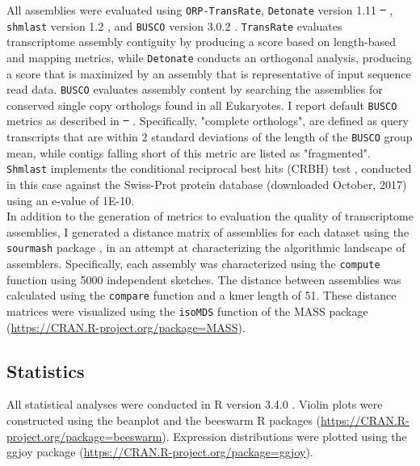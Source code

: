 \documentclass[10pt,letterpaper]{article}
\providecommand{\DIFaddtex}[1]{{\protect\color{blue}\uwave{#1}}} %
\providecommand{\DIFdeltex}[1]{{\protect\color{red}\sout{#1}}}                      %
\providecommand{\DIFaddbegin}{} %
\providecommand{\DIFaddend}{} %
\providecommand{\DIFdelbegin}{} %
\providecommand{\DIFdelend}{} %
\providecommand{\DIFadd}[1]{\texorpdfstring{\DIFaddtex{#1}}{#1}} %
\providecommand{\DIFdel}[1]{\texorpdfstring{\DIFdeltex{#1}}{}} %
\newcommand{\DIFscaledelfig}{0.5}
\newlength{\DIFdelgraphicswidth} %
\newlength{\DIFdelgraphicsheight} %
\newcommand{\DIFaddincludegraphics}[2][]{{\color{blue}\fbox{\DIFOincludegraphics[#1]{#2}}}} %
\newcommand{\DIFdelincludegraphics}[2][]{%
\sbox{\DIFdelgraphicsbox}{\DIFOincludegraphics[#1]{#2}}%
\settoboxwidth{\DIFdelgraphicswidth}{\DIFdelgraphicsbox} %
\settoboxtotalheight{\DIFdelgraphicsheight}{\DIFdelgraphicsbox} %
\scalebox{\DIFscaledelfig}{%
\parbox[b]{\DIFdelgraphicswidth}{\usebox{\DIFdelgraphicsbox}\\[-\baselineskip] \rule{\DIFdelgraphicswidth}{0em}}\llap{\resizebox{\DIFdelgraphicswidth}{\DIFdelgraphicsheight}{%
\setlength{\unitlength}{\DIFdelgraphicswidth}%
\begin{picture}(1,1)%
\thicklines\linethickness{2pt} %
{\color[rgb]{1,0,0}\put(0,0){\framebox(1,1){}}}%
{\color[rgb]{1,0,0}\put(0,0){\line( 1,1){1}}}%
{\color[rgb]{1,0,0}\put(0,1){\line(1,-1){1}}}%
\end{picture}%
}\hspace*{3pt}}} %
} %
\DeclareRobustCommand{\DIFaddbegin}{\DIFOaddbegin \let\includegraphics\DIFaddincludegraphics} %
\DeclareRobustCommand{\DIFaddend}{\DIFOaddend \let\includegraphics\DIFOincludegraphics} %
\DeclareRobustCommand{\DIFdelbegin}{\DIFOdelbegin \let\includegraphics\DIFdelincludegraphics} %
\DeclareRobustCommand{\DIFdelend}{\DIFOaddend \let\includegraphics\DIFOincludegraphics} %
\begin{document}
All assemblies were evaluated using \texttt{ORP-TransRate}, \texttt{Detonate} version 1.11 \DIFdelbegin \DIFdel{\mbox{%
\cite{Li:2014cm}}%
}\DIFdelend \DIFaddbegin \DIFadd{\mbox{%
\citep{Li:2014cm}}%
}\DIFaddend , \texttt{shmlast} version 1.2 \citep{Scott:2017eg}, and \texttt{BUSCO} version 3.0.2 \citep{Simao:2015kk}. \texttt{TransRate} evaluates transcriptome assembly contiguity by producing a score based on length-based and mapping metrics, while \texttt{Detonate} conducts an orthogonal analysis, producing a score that is maximized by an assembly that is representative of input sequence read data. \texttt{BUSCO} evaluates assembly content by searching the assemblies for conserved single copy orthologs found in all Eukaryotes. I report default \texttt{BUSCO} metrics as described in \DIFdelbegin \DIFdel{\mbox{%
\cite{Simao:2015kk}}%
}\DIFdelend \DIFaddbegin \DIFadd{\mbox{%
\citep{Simao:2015kk}}%
}\DIFaddend . Specifically, "complete orthologs", are defined as query transcripts that are within 2 standard deviations of the length of the \texttt{BUSCO} group mean, while contigs falling short of this metric are listed as "fragmented". \texttt{Shmlast} implements the conditional reciprocal best hits (CRBH) test \citep{Aubry:2014en}, conducted in this case against the Swiss-Prot protein database (downloaded October, 2017) using an e-value of 1E-10.   \\

In addition to the generation of metrics to evaluation the quality of transcriptome assemblies, I generated a distance matrix of assemblies for each dataset using the \texttt{sourmash} package \citep{TitusBrown:2016jg}, in an attempt at characterizing the algorithmic landscape of assemblers. Specifically, each assembly was characterized using the \texttt{compute} function using 5000 independent sketches. The distance between assemblies was calculated using the \texttt{compare} function and a kmer length of 51. These distance matrices were visualized using the \texttt{isoMDS} function of the MASS package (\url{https://CRAN.R-project.org/package=MASS}). 

\subsection{Statistics}

All statistical analyses were conducted in R version 3.4.0 \citep{RALanguageandEn:wf}. Violin plots were constructed using the beanplot \citep{Kampstra:2008vc} and the beeswarm R packages (\url{https://CRAN.R-project.org/package=beeswarm}). Expression distributions were plotted using the ggjoy package (\url{https://CRAN.R-project.org/package=ggjoy}).   
\end{document}
